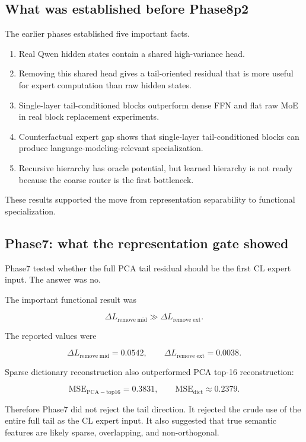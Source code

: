 \documentclass[11pt]{article}
\begin{document}
\subsection{What was established before Phase8p2}

The earlier phases established five important facts.

\begin{enumerate}[leftmargin=1.5em]
    \item Real Qwen hidden states contain a shared high-variance head.
    \item Removing this shared head gives a tail-oriented residual that is more useful for expert computation than raw hidden states.
    \item Single-layer tail-conditioned blocks outperform dense FFN and flat raw MoE in real block replacement experiments.
    \item Counterfactual expert gap shows that single-layer tail-conditioned blocks can produce language-modeling-relevant specialization.
    \item Recursive hierarchy has oracle potential, but learned hierarchy is not ready because the coarse router is the first bottleneck.
\end{enumerate}

These results supported the move from representation separability to functional specialization.

\subsection{Phase7: what the representation gate showed}

Phase7 tested whether the full PCA tail residual should be the first CL expert input. The answer was no.

The important functional result was

$$
\Delta L_{\mathrm{remove\;mid}}
\gg
\Delta L_{\mathrm{remove\;ext}}.
$$

The reported values were

$$
\Delta L_{\mathrm{remove\;mid}}=0.0542,
\qquad
\Delta L_{\mathrm{remove\;ext}}=0.0038.
$$

Sparse dictionary reconstruction also outperformed PCA top-16 reconstruction:

$$
\mathrm{MSE}_{\mathrm{PCA-top16}}=0.3831,
\qquad
\mathrm{MSE}_{\mathrm{dict}}\approx0.2379.
$$

Therefore Phase7 did not reject the tail direction. It rejected the crude use of the entire full tail as the CL expert input. It also suggested that true semantic features are likely sparse, overlapping, and non-orthogonal.
\end{document}
